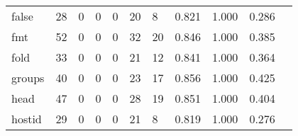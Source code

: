\begin{longtable}{lp{1.2cm}p{1.2cm}p{1.2cm}p{1.2cm}p{1.2cm}p{1.2cm}p{1.2cm}p{1.2cm}p{1.2cm}p{1.2cm}}
false     &                                    28 &                                                  0 &                                                  0 &                                                  0 &                                                 20 &                                                  8 &                                              0.821 &                                              1.000 &                                              0.286 \\
fmt       &                                    52 &                                                  0 &                                                  0 &                                                  0 &                                                 32 &                                                 20 &                                              0.846 &                                              1.000 &                                              0.385 \\
fold      &                                    33 &                                                  0 &                                                  0 &                                                  0 &                                                 21 &                                                 12 &                                              0.841 &                                              1.000 &                                              0.364 \\
groups    &                                    40 &                                                  0 &                                                  0 &                                                  0 &                                                 23 &                                                 17 &                                              0.856 &                                              1.000 &                                              0.425 \\
head      &                                    47 &                                                  0 &                                                  0 &                                                  0 &                                                 28 &                                                 19 &                                              0.851 &                                              1.000 &                                              0.404 \\
hostid    &                                    29 &                                                  0 &                                                  0 &                                                  0 &                                                 21 &                                                  8 &                                              0.819 &                                              1.000 &                                              0.276 \\

\end{longtable}
